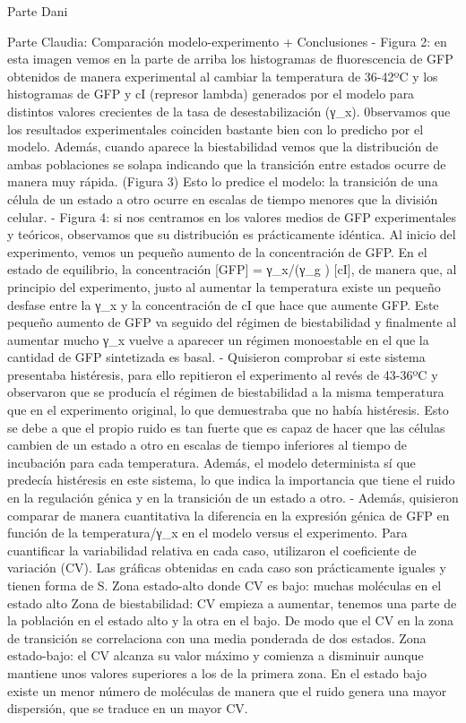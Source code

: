 Parte Dani


Parte Claudia: Comparación modelo-experimento + Conclusiones
- Figura 2: en esta imagen vemos en la parte de arriba los histogramas de fluorescencia de GFP obtenidos de manera experimental al cambiar la temperatura de 36-42ºC y los histogramas de GFP y cI (represor lambda) generados por el modelo para distintos valores crecientes de la tasa de desestabilización (γ_x). 0bservamos que los resultados experimentales coinciden bastante bien con lo predicho por el modelo. Además, cuando aparece la biestabilidad vemos que la distribución de ambas poblaciones se solapa indicando que la transición entre estados ocurre de manera muy rápida. (Figura 3) Esto lo predice el modelo: la transición de una célula de un estado a otro ocurre en escalas de tiempo menores que la división celular.
- Figura 4: si nos centramos en los valores medios de GFP experimentales y teóricos, observamos que su distribución es prácticamente idéntica. Al inicio del experimento, vemos un pequeño aumento de la concentración de GFP. En el estado de equilibrio, la concentración [GFP] =  γ_x/(γ_g  ) [cI], de manera que, al principio del experimento, justo al aumentar la temperatura existe un pequeño desfase entre la γ_x y la concentración de cI que hace que aumente GFP. Este pequeño aumento de GFP va seguido del régimen de biestabilidad y finalmente al aumentar mucho  γ_x vuelve a aparecer un régimen monoestable en el que la cantidad de GFP sintetizada es basal.
- Quisieron comprobar si este sistema presentaba histéresis, para ello repitieron el experimento al revés de 43-36ºC y observaron que se producía el régimen de biestabilidad a la misma temperatura que en el experimento original, lo que demuestraba que no había histéresis. Esto se debe a que el propio ruido es tan fuerte que es capaz de hacer que las células cambien de un estado a otro en escalas de tiempo inferiores al tiempo de incubación para cada temperatura. Además, el modelo determinista sí que predecía histéresis en este sistema, lo que indica la importancia que tiene el ruido en la regulación génica y en la transición de un estado a otro.
- Además, quisieron comparar de manera cuantitativa la diferencia en la expresión génica de GFP en función de la temperatura/γ_x  en el modelo versus el experimento. Para cuantificar la variabilidad relativa en cada caso, utilizaron el coeficiente de variación (CV). Las gráficas obtenidas en cada caso son prácticamente iguales y tienen forma de S. 
	Zona estado-alto donde CV es bajo: muchas moléculas en el estado alto 
	Zona de biestabilidad: CV empieza a aumentar, tenemos una parte de la población en el estado alto y la otra en el bajo. De modo que el CV en la zona de transición se correlaciona con una media ponderada de dos estados.
	Zona estado-bajo: el CV alcanza su valor máximo y comienza a disminuir aunque mantiene unos valores superiores a los de la primera zona. En el estado bajo existe un menor número de moléculas de manera que el ruido genera una mayor dispersión, que se traduce en un mayor CV.
	
